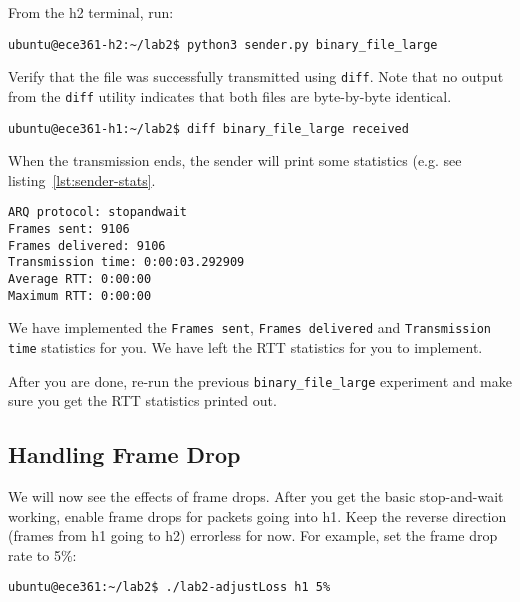 \documentclass[11pt]{article}
\begin{document}
From the h2 terminal, run:
\begin{lstlisting}[style=ece361-shell-base, caption={}]
ubuntu@ece361-h2:~/lab2$ python3 sender.py binary_file_large
\end{lstlisting}

Verify that the file was successfully transmitted using \texttt{diff}.
Note that no output from the \texttt{diff} utility indicates that both files are byte-by-byte identical.
\begin{lstlisting}[style=ece361-shell-base, caption={}]
ubuntu@ece361-h1:~/lab2$ diff binary_file_large received
\end{lstlisting}

When the transmission ends, the sender will print some statistics (e.g. see listing~\ref{lst:sender-stats}.
\begin{lstlisting}[style=ece361-shell-base, caption={Example of sender statistics}, label={lst:sender-stats}]
ARQ protocol: stopandwait
Frames sent: 9106
Frames delivered: 9106
Transmission time: 0:00:03.292909
Average RTT: 0:00:00
Maximum RTT: 0:00:00
\end{lstlisting}

We have implemented the \texttt{Frames sent}, \texttt{Frames delivered} and \texttt{Transmission time} statistics for you.
We have left the RTT statistics for you to implement.

After you are done, re-run the previous \texttt{binary\_file\_large} experiment and make sure you get the RTT statistics printed out.


\subsection{Handling Frame Drop}
We will now see the effects of frame drops. After you get the basic stop-and-wait working, enable frame drops for packets going into h1.
Keep the reverse direction (frames from h1 going to h2) errorless for now.
For example, set the frame drop rate to 5\%:
\begin{lstlisting}[style=ece361-shell-base, caption={}]
ubuntu@ece361:~/lab2$ ./lab2-adjustLoss h1 5%
\end{lstlisting}
\end{document}
